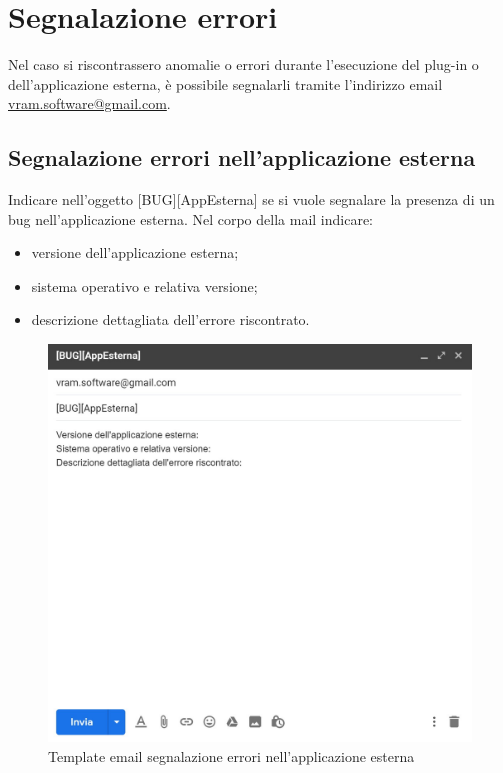 \section{Segnalazione errori}
Nel caso si riscontrassero anomalie o errori durante l'esecuzione del plug-in o dell'applicazione esterna, è possibile segnalarli tramite l'indirizzo email {\url{vram.software@gmail.com}}.
	\subsection{Segnalazione errori nell'applicazione esterna}
	Indicare nell'oggetto [BUG][AppEsterna] se si vuole segnalare la presenza di un bug nell'applicazione esterna.
	Nel corpo della mail indicare:
	\begin{itemize}
		\item versione dell'applicazione esterna;
		\item sistema operativo e relativa versione;
		\item descrizione dettagliata dell'errore riscontrato.
	\end{itemize}
	\mbox{}
	\begin{figure} [H]
		\begin{center}
			\includegraphics[width=120mm]{./img/erroriApp.jpg}
		\end{center}
		\caption{Template email segnalazione errori nell'applicazione esterna}
	\end{figure}
	\mbox{}
